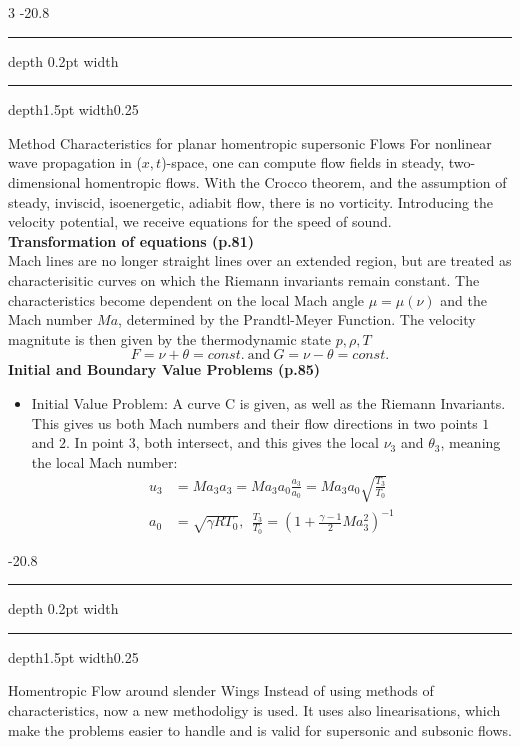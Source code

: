\documentclass[8pt, landscape, fleqn]{scrartcl}
\makeatletter
\renewcommand{\section}{\@startsection{section}{1}{0mm}%
{-2\baselineskip}{0.8\baselineskip}%
{\hrule depth 0.2pt width\columnwidth\hrule depth1.5pt
width0.25\columnwidth\vspace*{1.2em}\Large\bfseries\rmfamily}}
\makeatother
\begin{document}
\begin{multicols*}{3}
\section{Method Characteristics for planar homentropic supersonic Flows}
For nonlinear wave propagation in ($x,t$)-space, one can compute flow fields in steady, two-dimensional homentropic flows. With the Crocco theorem, and the assumption of steady, inviscid, isoenergetic, adiabit flow, there is no vorticity. Introducing the velocity potential, we receive equations for the speed of sound. \\

\textbf{Transformation of equations (p.81)}\\
Mach lines are no longer straight lines over an extended region, but are treated as characterisitic curves on which the Riemann invariants remain constant. The characteristics become dependent on the local Mach angle $\mu = \mu(\nu)$ and the Mach number $Ma$, determined by the Prandtl-Meyer Function. The velocity magnitute is then given by the thermodynamic state ${p, \rho, T}$
\begin{equation*}
    F = \nu + \theta = const.~ \text{and}~ G = \nu - \theta = const.
\end{equation*} 
\textbf{Initial and Boundary Value Problems (p.85)}
\begin{itemize}
    \item Initial Value Problem: A curve C is given, as well as the Riemann Invariants. This gives us both Mach numbers and their flow directions in two points $1$ and $2$. In point $3$, both intersect, and this gives the local $\nu_3$ and $\theta_3$, meaning the local Mach number:
    \begin{align*}
        u_3 &= Ma_3 a_3 = Ma_3 a_0 \frac{a_3}{a_0} = Ma_3 a_0 \sqrt{\frac{T_3}{T_0}} \\
        a_0 &= \sqrt{\gamma R T_0},~~\frac{T_3}{T_0} = \left( 1 + \frac{\gamma-1}{2}Ma_3^2\right)^{-1}
    \end{align*}
\end{itemize}

\section{Homentropic Flow around slender Wings}
Instead of using methods of characteristics, now a new methodoligy is used. It uses also linearisations, which make the problems easier to handle and is valid for supersonic and subsonic flows. \\


\end{multicols*}
\end{document}
